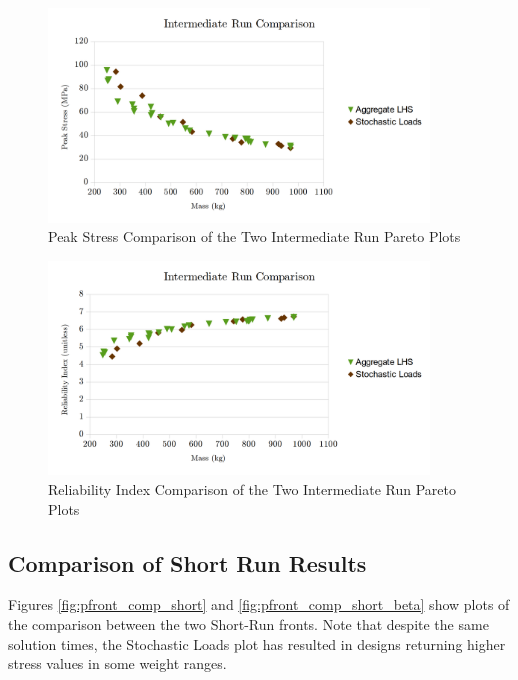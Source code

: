 \begin{figure}[!htbp]
\includegraphics[width=0.9\textwidth]{img/pf_comp_int.png}
\caption{Peak Stress Comparison of the Two Intermediate Run Pareto Plots}
\label{fig:pfront_comp_int}
\end{figure}
\begin{figure}[!htbp]
\includegraphics[width=0.9\textwidth]{img/pf_comp_int_beta.png}
\caption{Reliability Index Comparison of the Two Intermediate Run Pareto Plots}
\label{fig:pfront_comp_int_beta}
\end{figure}

\subsection{Comparison of Short Run Results}
Figures \ref{fig:pfront_comp_short} and \ref{fig:pfront_comp_short_beta} show plots of the comparison between the two Short-Run fronts. Note that despite the same solution times, the Stochastic Loads plot has resulted in designs returning higher stress values in some weight ranges. 

